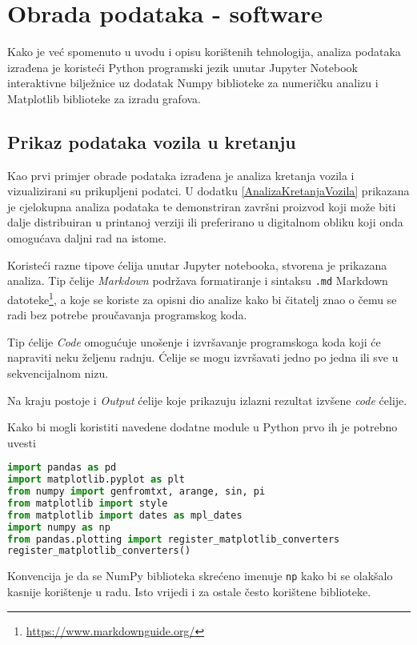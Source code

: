 \chapter{Obrada podataka - software}\label{ch:Software}
Kako je već spomenuto u uvodu i opisu korištenih tehnologija, analiza podataka izrađena je koristeći Python programski jezik unutar Jupyter Notebook interaktivne bilježnice uz dodatak Numpy biblioteke za numeričku analizu i Matplotlib biblioteke za izradu grafova.

\section{Prikaz podataka vozila u kretanju}
Kao prvi primjer obrade podataka izrađena je analiza kretanja vozila i vizualizirani su prikupljeni podatci.
U dodatku \ref{AnalizaKretanjaVozila} prikazana je cjelokupna analiza podataka te demonstriran završni proizvod koji može biti dalje distribuiran u printanoj verziji ili preferirano u digitalnom obliku koji onda omogućava daljni rad na istome.

Koristeći razne tipove ćelija unutar Jupyter notebooka, stvorena je prikazana analiza.
Tip čelije \textit{Markdown} podržava formatiranje i sintaksu \texttt{.md} Markdown datoteke\footnote{\url{https://www.markdownguide.org/}}, a koje se koriste za opisni dio analize kako bi čitatelj znao o čemu se radi bez potrebe proučavanja programskog koda.

Tip ćelije \textit{Code} omogućuje unošenje i izvršavanje programskoga koda koji će napraviti neku željenu radnju.
Ćelije se mogu izvršavati jedno po jedna ili sve u sekvencijalnom nizu.

Na kraju postoje i \textit{Output} ćelije koje prikazuju izlazni rezultat izvšene \textit{code} ćelije.

Kako bi mogli koristiti navedene dodatne module u Python prvo ih je potrebno uvesti
\begin{lstlisting}[language=Python]
import pandas as pd
import matplotlib.pyplot as plt
from numpy import genfromtxt, arange, sin, pi
from matplotlib import style
from matplotlib import dates as mpl_dates
import numpy as np
from pandas.plotting import register_matplotlib_converters
register_matplotlib_converters()
\end{lstlisting}

Konvencija je da se NumPy biblioteka skrećeno imenuje \texttt{np} kako bi se olakšalo kasnije korištenje u radu.
Isto vrijedi i za ostale često korištene biblioteke.

